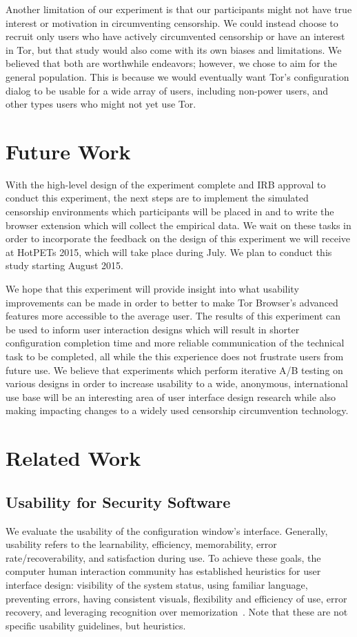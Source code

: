 \documentclass[letterpaper,twocolumn,11pt]{article}
\begin{document}
Another limitation of our experiment is that our participants might not have true interest or motivation in
circumventing censorship. We could instead choose to recruit only users who have actively circumvented
censorship or have an interest in Tor, but that study would also come with its own biases and limitations.
We believed that both are worthwhile endeavors; however, we chose to aim for the general population. 
This is because we would eventually want Tor's configuration dialog to be usable for a wide array of users, 
including non-power users, and other types users who might not yet use Tor. 

\section{Future Work}
\indent \indent With the high-level design of the experiment complete and IRB approval  to conduct this
experiment,  the next steps are to implement the simulated censorship environments which participants 
will be placed in and to write the browser extension which will collect the empirical data. 
We wait on these tasks in order to incorporate the feedback on the design of this experiment 
we will receive at HotPETs 2015, which will take place during July. We plan to conduct this study starting 
August 2015. 

We hope that this experiment will provide insight into what usability improvements can be made 
in order to better to make Tor Browser's advanced features more accessible to the average user. The results
of this experiment can be used to inform user interaction designs which will result in shorter configuration
completion time and more reliable communication of the technical task to be completed, all while the 
this experience does not frustrate users from future use. We believe that experiments which perform
iterative A/B testing on various designs in order to increase usability to a wide, anonymous, international 
use base will be an interesting area of user interface design research while also making impacting changes
to a widely used censorship circumvention technology. 

\section{Related Work}

\subsection{Usability for Security Software}
\indent \indent 
We evaluate the usability of the configuration window's interface. Generally, usability 
refers to the learnability, efficiency, memorability, error rate/recoverability, and satisfaction
during use. To achieve these goals, the computer human interaction community has established 
heuristics for user interface design: visibility of the system status, using familiar
language, preventing errors, having consistent visuals, flexibility and efficiency of use, 
error recovery, and leveraging recognition over memorization~\cite{nielsen199510}. Note
that these are not specific usability guidelines, but heuristics. 
\end{document}

